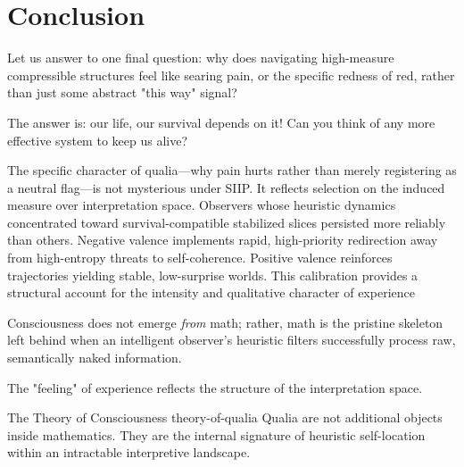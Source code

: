 \section{Conclusion}

Let us answer to one final question:
why does navigating high-measure compressible structures feel like searing pain, or the specific redness of red, rather than just some abstract "this way" signal?

The answer is: our life, our survival depends on it!  Can you think of any more effective system to keep us alive? 

The specific character of qualia—why pain hurts rather than merely registering as a neutral flag—is not mysterious under SIIP.
It reflects selection on the induced measure over interpretation space.
Observers whose heuristic dynamics concentrated toward survival-compatible stabilized slices persisted more reliably than others.
Negative valence implements rapid, high-priority redirection away from high-entropy threats to self-coherence.
Positive valence reinforces trajectories yielding stable, low-surprise worlds.
This calibration provides a structural account for the intensity and qualitative character of experience

Consciousness does not emerge \emph{from} math; rather, math is the pristine skeleton left behind when an intelligent observer's heuristic filters successfully process raw, semantically naked information.

The "feeling" of experience reflects the structure of the interpretation space.

\begin{principle}{The Theory of Consciousness}
{theory-of-qualia}
Qualia are not additional objects inside mathematics.
They are the internal signature of heuristic self-location within an intractable interpretive landscape.
\end{principle}

